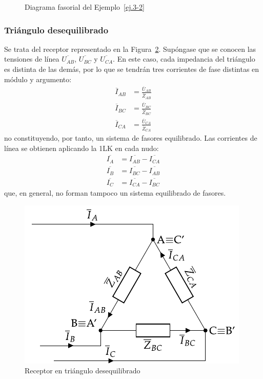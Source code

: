 \begin{example}
\begin{figure}[H]
	        \caption{Diagrama fasorial del Ejemplo~\ref{ej.3-2}}
	        \label{fig.diagrama_ejemplo_3-2}
	    \end{figure}
	\end{example}
	
	\subsubsection{Triángulo desequilibrado}
	Se trata del receptor representado en la Figura~\ref{fig.trianguloDesequilibrado_receptor}. Supóngase que se conocen las tensiones de línea $\overline{U_{AB}}$, $\overline{U_{BC}}$ y $\overline{U_{CA}}$. En este caso, cada impedancia del triángulo es distinta de las demás, por lo que se tendrán tres corrientes de fase distintas en módulo y argumento:
	\begin{align*}
      \overline{I}_{AB} &= \frac{\overline{U}_{AB}}{\overline{Z}_{AB}}\\
      \overline{I}_{BC} &= \frac{\overline{U}_{BC}}{\overline{Z}_{BC}}\\
      \overline{I}_{CA} &= \frac{\overline{U}_{CA}}{\overline{Z}_{CA}}
    \end{align*}
    no constituyendo, por tanto, un sistema de fasores equilibrado. Las corrientes de línea se obtienen aplicando la 1LK en cada nudo:
    \begin{align}
      \overline{I_A} &= \overline{I_{AB}} - \overline{I_{CA}} \\
      \overline{I_B} &= \overline{I_{BC}} - \overline{I_{AB}}\\
      \overline{I_C} &= \overline{I_{CA}} - \overline{I_{BC}}
    \end{align}
    que, en general, no forman tampoco un sistema equilibrado de fasores.
	\begin{figure}[H]
	    \centering
	    \includegraphics{../figs/trianguloDesequilibrado_receptor.pdf}
	    \caption{Receptor en triángulo desequilibrado}
	    \label{fig.trianguloDesequilibrado_receptor}
	\end{figure}
	

